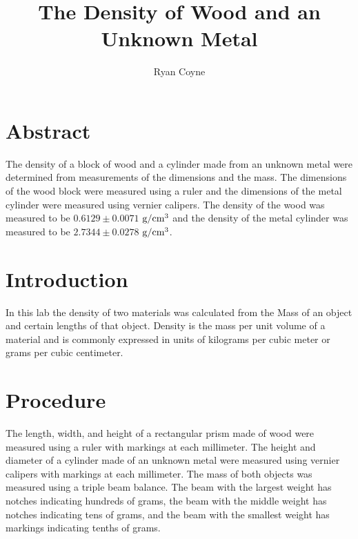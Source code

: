 \documentclass[12pt]{article}
\begin{document}
    \title{The Density of Wood and an Unknown Metal}
    \author{Ryan Coyne}
    \maketitle
    \section{Abstract}
        The density of a block of wood and a cylinder made from an unknown metal were determined
        from measurements of the dimensions and the mass. The dimensions of the wood block were
        measured using a ruler and the dimensions of the metal cylinder were measured using vernier
        calipers. The density of the wood was measured to be \(0.6129 \pm 0.0071\) \( \text{g}/\text{\text{cm}}^3\) and the
        density of the metal cylinder was measured to be \(2.7344 \pm 0.0278\) \(\text{g}/\text{\text{cm}}^3\).
    \section{Introduction}
        In this lab the density of two materials was calculated from the Mass of an object and certain
        lengths of that object. Density is the mass per unit volume of a material and is commonly
        expressed in units of kilograms per cubic meter or grams per cubic centimeter. 
    \section{Procedure}
        The length, width, and height of a rectangular prism made of wood were measured using a ruler
        with markings at each millimeter. The height and diameter of a cylinder made of an unknown
        metal were measured using vernier calipers with markings at each millimeter. The mass of 
        both objects was measured using a triple beam balance. The beam with the largest weight has 
        notches indicating hundreds of grams, the beam with the middle weight has notches 
        indicating tens of grams, and the beam with the smallest weight has markings indicating 
        tenths of grams.
\end{document}
